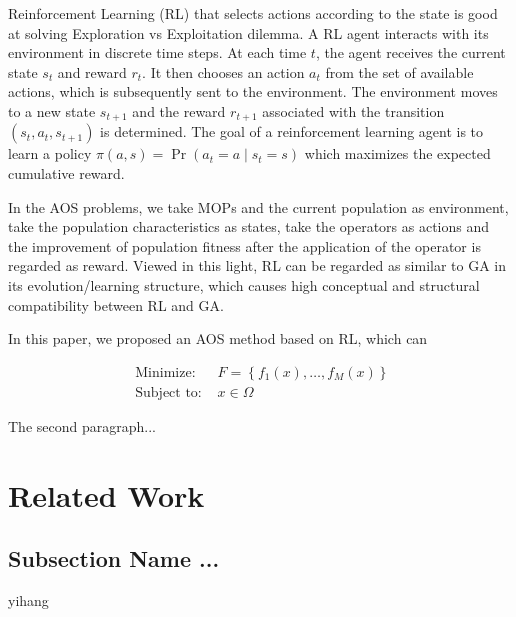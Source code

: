 \documentclass[journal]{IEEEtran}
\begin{document}
Reinforcement Learning (RL) that selects actions according to the state is good at solving Exploration vs Exploitation dilemma.
A RL agent interacts with its environment in discrete time steps. At each time $t$, the agent receives the current state $s_t$ and reward $r_t$. It then chooses an action $a_t$ from the set of available actions, which is subsequently sent to the environment. The environment moves to a new state $s_{t+1}$ and the reward $r_{t+1}$ associated with the transition $(s_t, a_t, s_{t+1})$ is determined. The goal of a reinforcement learning agent is to learn a policy $\pi(a, s)=\operatorname{Pr}\left(a_{t}=a \mid s_{t}=s\right)$ which maximizes the expected cumulative reward.

In the AOS problems, we take MOPs and the current population as environment, take the population characteristics as states, take the operators as actions and the improvement of population fitness after the application of the operator is regarded as reward.
Viewed in this light, RL can be regarded as similar to GA in its evolution/learning structure, which causes high conceptual and structural compatibility between RL and GA.

In this paper, we proposed an AOS method based on RL, which can




\begin{equation}
  \begin{array}{ll}
    \text { Minimize: }   & F=\left\{f_{1}(x), \ldots, f_{M}(x)\right\} \\
    \text { Subject to: } & x \in \Omega
  \end{array}
\end{equation}






\IEEEpubidadjcol

The second paragraph...
\section{Related Work}

\subsection{Subsection Name ... }
yihang
\end{document}
